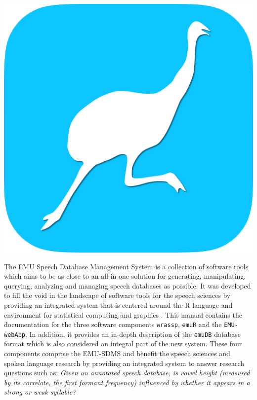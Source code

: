 \documentclass[]{book}
\theoremstyle{definition}
\theoremstyle{definition}
\theoremstyle{definition}
\theoremstyle{remark}
\begin{document}
\includegraphics[width=14.22in]{pics/EMU-webAppIcon-roundCorners}

The EMU Speech Database Management System is a collection of software
tools which aims to be as close to an all-in-one solution for
generating, manipulating, querying, analyzing and managing speech
databases as possible. It was developed to fill the void in the
landscape of software tools for the speech sciences by providing an
integrated system that is centered around the R language and environment
for statistical computing and graphics \citep{r-core-team:2016a}. This
manual contains the documentation for the three software components
\texttt{wrassp}, \texttt{emuR} and the \texttt{EMU-webApp}. In addition,
it provides an in-depth description of the \texttt{emuDB} database
format which is also considered an integral part of the new system.
These four components comprise the EMU-SDMS and benefit the speech
sciences and spoken language research by providing an integrated system
to answer research questions such as: \emph{Given an annotated speech
database, is vowel height (measured by its correlate, the first formant
frequency) influenced by whether it appears in a strong or weak
syllable?}
\end{document}
